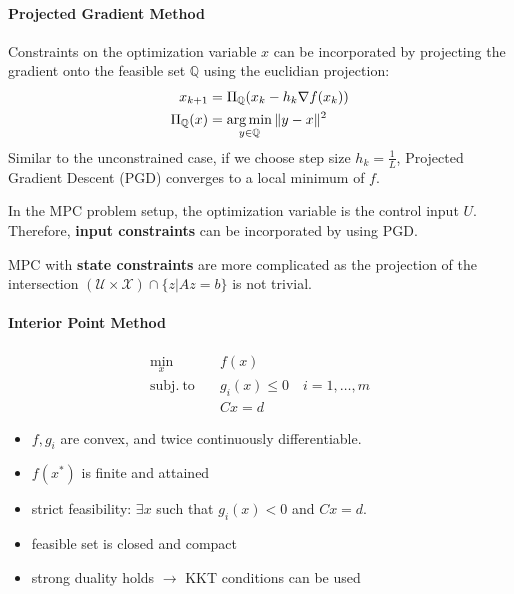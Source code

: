 \paragraph{Projected Gradient Method}
Constraints on the optimization variable $x$ can be incorporated by projecting the gradient onto the feasible set $\mathbb{Q}$ using the euclidian projection:
\begin{align*}
    x_{k+1}             & = \Pi_{\mathbb{Q}}(x_k - h_k \nabla f(x_k)) \\
    \Pi_{\mathbb{Q}}(x) & = \operatorname*{arg\,min}_{y\in\mathbb{Q}} \|y-x\|^2
\end{align*}
Similar to the unconstrained case, if we choose step size $h_k = \frac{1}{L}$, Projected Gradient Descent (PGD) converges to a local minimum of $f$.

\newpar{}

In the MPC problem setup, the optimization variable is the control input $U$. Therefore, \textbf{input constraints} can be incorporated by using PGD.

\newpar{}
MPC with \textbf{state constraints} are more complicated as the projection of the intersection $(\mathcal{U}\times \mathcal{X}) \cap \{ z|Az=b\}$ is not trivial.

\paragraph{Interior Point Method}
\begin{align*}
    \min_x \quad            & f(x)                             \\
    \mathrm{subj.\ to}\quad & g_i(x)\leq 0 \quad i=1,\ldots, m \\
                            & Cx = d
\end{align*}
\begin{itemize}
    \item $f, g_i$ are convex, and twice continuously differentiable.
    \item $f(x^*)$ is finite and attained
    \item strict feasibility: $\exists x$ such that $g_i(x) < 0$ and $Cx = d$.
    \item feasible set is closed and compact
    \item strong duality holds $\to$ KKT conditions can be used
\end{itemize}

\newpar{}

